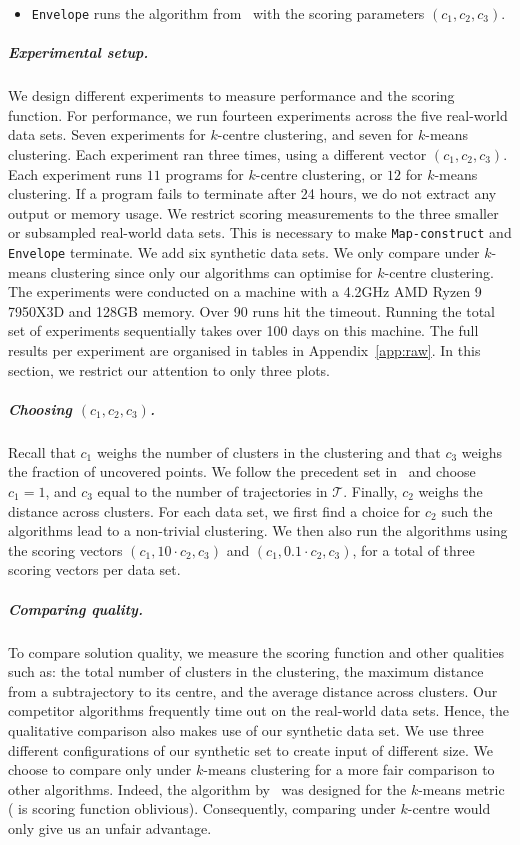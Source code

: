 %
\begin{itemize}
    \item \texttt{Envelope} runs the algorithm from~\cite{agarwal2018subtrajectory} with the scoring parameters $(c_1, c_2, c_3)$. 
\end{itemize}
%
%
%
%
%
\subparagraph{Experimental setup.}
We design different experiments to measure performance and the scoring function.  For performance, we run fourteen experiments across the five real-world data sets.
Seven experiments for $k$-centre clustering, and seven for $k$-means clustering. 
Each experiment ran three times, using a different vector $(c_1, c_2, c_3)$. 
Each experiment runs $11$ programs for $k$-centre clustering, or $12$ for $k$-means clustering. If a program fails to terminate after 24 hours, we do not extract any output or memory usage. 
%
We restrict scoring measurements to the three smaller or subsampled real-world data sets. This is necessary to make \texttt{Map-construct} and \texttt{Envelope} terminate.  We add six synthetic data sets. We only compare under $k$-means clustering since only our algorithms can optimise for $k$-centre clustering.  
The experiments were conducted on a machine with a 4.2GHz AMD Ryzen 9 7950X3D and 128GB memory.
Over 90 runs hit the timeout. 
Running the total set of experiments sequentially takes over 100 days on this machine. 
%
The full results per experiment are organised in tables in Appendix~\ref{app:raw}.
In this section, we restrict our attention to only three plots. 
%
%
\subparagraph{Choosing $(c_1, c_2, c_3)$.}
Recall that $c_1$ weighs the number of clusters in the clustering and that $c_3$ weighs the fraction of uncovered points. 
We follow the precedent set in~\cite{agarwal2018subtrajectory} and choose $c_1 = 1$, and $c_3$ equal to the number of trajectories in $\mathcal{T}$. 
Finally, $c_2$ weighs the \frechet distance across clusters. 
For each data set, we first find a choice for $c_2$ such the algorithms lead to a non-trivial clustering. We then also run the algorithms using the scoring vectors $(c_1, 10 \cdot  c_2, c_3)$ and $(c_1, 0.1 \cdot  c_2, c_3)$, for a total of three scoring vectors per data set. 
%
\subparagraph{Comparing quality.}
To compare solution quality, we measure the scoring function and other qualities such as: the total number of clusters in the clustering, the maximum \frechet distance from a subtrajectory to its centre, and the average \frechet distance across clusters. Our competitor algorithms frequently time out on the real-world data sets.
Hence, the qualitative comparison also makes use of our synthetic data set. We use three different configurations of our synthetic set to create input of different size. We choose to compare only under $k$-means clustering for a more fair comparison to other algorithms. Indeed, the algorithm by~\cite{agarwal2018subtrajectory} was designed for the $k$-means metric (\cite{buchin2020improved} is scoring function oblivious). 
Consequently, comparing under $k$-centre would only give us an unfair advantage.
%
%
